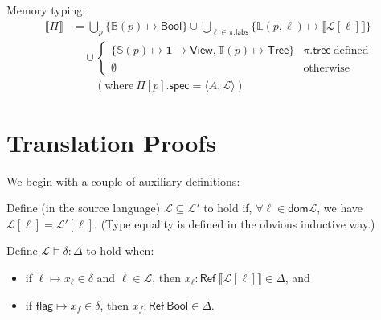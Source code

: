 \documentclass{article}
\newcommand{\mf}[1]{\mathsf{#1}}
\newcommand{\mc}[1]{\mathcal{#1}}
\newcommand{\mb}[1]{\mathbf{#1}}
\newcommand{\dom}{\mf{dom}}
\newcommand{\llrr}[1]{\llbracket #1 \rrbracket}
\newcommand{\pair}[2]{\langle #1, #2 \rangle}
\newcommand{\tone}{\mb{1}}
\newcommand{\tbool}{\mf{Bool}}
\newcommand{\tview}{\mf{View}}
\newcommand{\ttree}{\mf{Tree}}
\newcommand{\tref}[1]{\mf{Ref}\ #1}
\newcommand{\Ell}{\mc{L}}
\begin{document}
Memory typing:
\begin{align*}
\llrr{\Pi} &= \bigcup_p \{\mathbb{B}(p) \mapsto \tbool\}
\cup \bigcup_{\ell \in \pi.\mf{labs}} \{\mathbb{L}(p, \ell) \mapsto \llrr{\Ell[\ell]}\}\\
&\quad\cup \begin{cases}
\{\mathbb{S}(p) \mapsto \tone \rightarrow \tview,
  \mathbb{T}(p) \mapsto \ttree
\} &\pi.\mf{tree}\ \text{defined}\\
\emptyset &\text{otherwise}
\end{cases}\\
&\qquad(\text{where}\ \Pi[p].\mf{spec} = \pair{A}{\Ell})
\end{align*}

\section{Translation Proofs}

We begin with a couple of auxiliary definitions:

Define (in the source language) $\Ell \subseteq \Ell'$ to hold if,
$\forall \ell \in \dom \Ell$, we have $\Ell[\ell] = \Ell'[\ell]$.
(Type equality is defined in the obvious inductive way.)

Define $\Ell \vDash \delta: \Delta$ to hold when:
\begin{itemize}
\item if $\ell \mapsto x_\ell \in \delta$ and $\ell \in \Ell$,
then $x_\ell: \tref{\llrr{\Ell[\ell]}} \in \Delta$, and
\item if $\mf{flag} \mapsto x_f \in \delta$,
then $x_f: \tref{\tbool} \in \Delta$.
\end{itemize}
\end{document}
